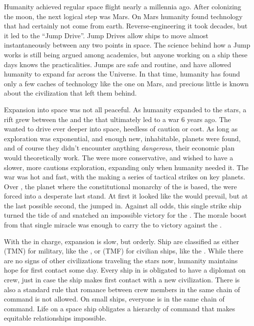 \documentclass[blue]{TMFHope}
\begin{document}
\name{\bHistory{}}

Humanity achieved regular space flight nearly a millennia ago. After colonizing the moon, the next logical step was Mars. On Mars humanity found technology that had certainly not come from earth. Reverse-engineering it took decades, but it led to the ``Jump Drive''. Jump Drives allow ships to move almost instantaneously between any two points in space. The science behind how a Jump works is still being argued among academics, but anyone working on a ship these days knows the practicalities. Jumps are safe and routine, and have allowed humanity to expand far across the Universe. In that time, humanity has found only a few caches of technology like the one on Mars, and precious little is known about the civilization that left them behind.

Expansion into space was not all peaceful. As humanity expanded to the stars, a rift grew between the \pPlan{} and the \pEdge{} that ultimately led to a war 6 years ago. The \pEdge{} wanted to drive ever deeper into space, heedless of caution or cost. As long as exploration was exponential, and enough new, inhabitable, planets were found, and of course they didn't encounter anything \emph{dangerous}, their economic plan would theoretically work. The \pPlan{} were more conservative, and wished to have a slower, more cautions exploration, expanding only when humanity needed it. The war was hot and fast, with the \pEdge{} making a series of tactical strikes on key \pPlan{} planets. Over \pHome{}, the planet where the constitutional monarchy of the \pPlan{} is based, the \pPlan{} were forced into a desperate last stand. At first it looked like the \pEdge{} would prevail, but at the last possible second, the \pOld{} jumped in. Against all odds, this single strike ship turned the tide of \pBattle{} and snatched an impossible victory for the \pPlan{}. The morale boost from that single miracle was enough to carry the \pPlan{} to victory against the \pEdge{}.

With the \pPlan{} in charge, expansion is slow, but orderly. Ship are classified as either \pTMN{} (TMN) for military, like the \pOld{}, or \pTMF{} (TMF) for civilian ships, like the \pNew{}. While there are no signs of other civilizations traveling the stars now, humanity maintains hope for first contact some day. Every ship in \pTMF{} is obligated to have a diplomat on crew, just in case the ship makes first contact with a new civilization. There is also a standard rule that romance between crew members in the same chain of command is not allowed. On small \pTMF{} ships, everyone is in the same chain of command. Life on a space ship obligates a hierarchy of command that makes equitable relationships impossible.
\end{document}
